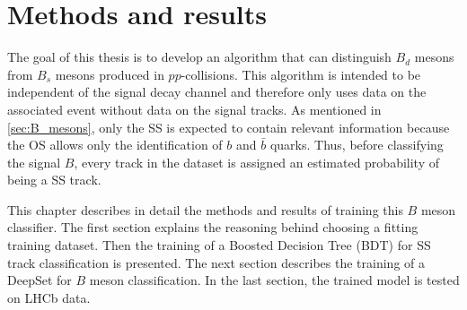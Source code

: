 \chapter{Methods and results}


The goal of this thesis is to develop an algorithm that can distinguish $B_d$ mesons from $B_s$ mesons produced in $pp$-collisions.
This algorithm is intended to be independent of the signal decay channel and therefore only uses data on the associated event without data on the signal tracks.
As mentioned in \autoref{sec:B_mesons}, only the SS is expected to contain relevant information because the OS allows only the identification of $b$ and $\bar{b}$ quarks.
Thus, before classifying the signal $B$, every track in the dataset is assigned an estimated probability of being a SS track.

This chapter describes in detail the methods and results of training this $B$ meson classifier.
The first section explains the reasoning behind choosing a fitting training dataset.
Then the training of a Boosted Decision Tree (BDT) for SS track classification is presented.
The next section describes the training of a DeepSet for $B$ meson classification.
In the last section, the trained model is tested on LHCb data.




